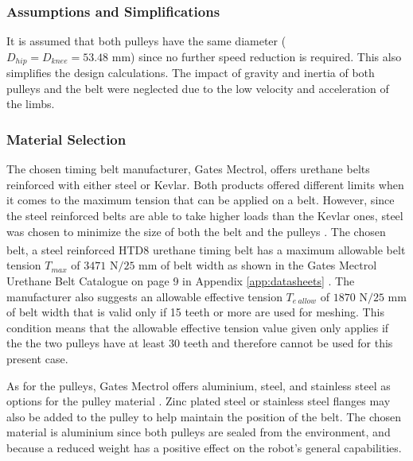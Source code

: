\subsubsection{Assumptions and Simplifications}

It is assumed that both pulleys have the same diameter ($D_{hip} = D_{knee} = 53.48\text{ mm}$) since no further speed reduction is required. This also simplifies the design calculations. The impact of gravity and inertia of both pulleys and the belt were neglected due to the low velocity and acceleration of the limbs. \\

\subsubsection{Material Selection}

The chosen timing belt manufacturer, Gates Mectrol, offers urethane belts reinforced with either steel or Kevlar. Both products offered different limits when it comes to the maximum tension that can be applied on a belt. However, since the steel reinforced belts are able to take higher loads than the Kevlar ones, steel was chosen to minimize the size of both the belt and the pulleys \cite{gates_mectrol_urethane_2018}. The chosen belt, a steel reinforced HTD\textsuperscript{\textregistered}8 urethane timing belt has a maximum allowable belt tension $T_{max}$ of $3471\text{ N/}25\text{ mm}$ of belt width as shown in the Gates Mectrol Urethane Belt Catalogue on page 9 in Appendix \ref{app:datasheets} \cite{gates_mectrol_urethane_2018}. The manufacturer also suggests an allowable effective tension $T_{e\ allow}$ of $1870 \text{ N/}25\text{ mm}$ of belt width that is valid only if 15 teeth or more are used for meshing. This condition means that the allowable effective tension value given only applies if the the two pulleys have at least 30 teeth and therefore cannot be used for this present case.

As for the pulleys, Gates Mectrol offers aluminium, steel, and stainless steel as options for the pulley material \cite{gates_mectrol_urethane_2018}. Zinc plated steel or stainless steel flanges may also be added to the pulley to help maintain the position of the belt. The chosen material is aluminium since both pulleys are sealed from the environment, and because a reduced weight has a positive effect on the robot's general capabilities.

